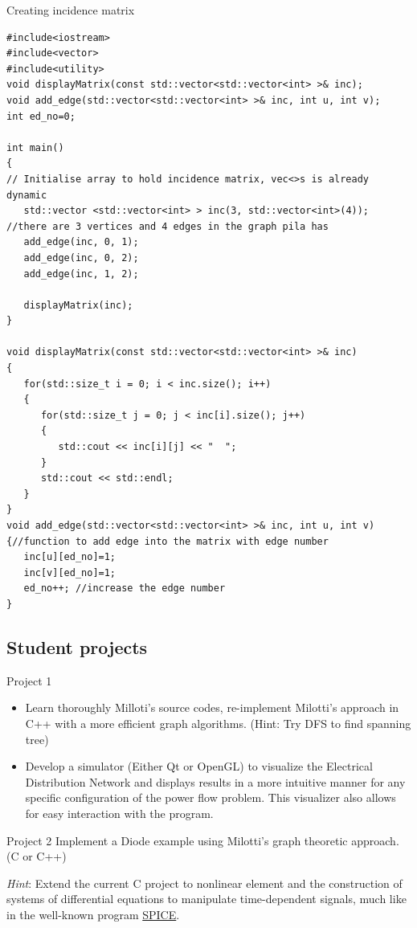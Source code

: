\documentclass[xcolor=dvipsnames]{beamer}
\begin{document}
\begin{frame}[fragile,shrink=5]{Creating incidence matrix}
\begin{verbatim}
#include<iostream>
#include<vector>
#include<utility>
void displayMatrix(const std::vector<std::vector<int> >& inc);
void add_edge(std::vector<std::vector<int> >& inc, int u, int v);
int ed_no=0;

int main() 
{
// Initialise array to hold incidence matrix, vec<>s is already dynamic
   std::vector <std::vector<int> > inc(3, std::vector<int>(4));
//there are 3 vertices and 4 edges in the graph pila has
   add_edge(inc, 0, 1);
   add_edge(inc, 0, 2);
   add_edge(inc, 1, 2);
   
   displayMatrix(inc);
}

void displayMatrix(const std::vector<std::vector<int> >& inc) 
{
   for(std::size_t i = 0; i < inc.size(); i++)
   { 
      for(std::size_t j = 0; j < inc[i].size(); j++) 
      {
         std::cout << inc[i][j] << "  ";
      }
      std::cout << std::endl;
   }
}
void add_edge(std::vector<std::vector<int> >& inc, int u, int v) 
{//function to add edge into the matrix with edge number
   inc[u][ed_no]=1;
   inc[v][ed_no]=1;
   ed_no++; //increase the edge number
}
\end{verbatim}	
\end{frame}

\subsection{Student projects}

\begin{frame}{Project 1}
\begin{itemize}
	\item Learn thoroughly Milloti's source codes, re-implement Milotti's approach in C++ with a more efficient graph algorithms. (Hint: Try DFS to find spanning tree)
	\item Develop a simulator (Either Qt or OpenGL) to visualize the Electrical Distribution Network and displays results in a more intuitive manner for any specific configuration of the power flow problem. This visualizer also allows for easy interaction with the program.
\end{itemize}

\end{frame}

\begin{frame}{Project 2}
	Implement a Diode example using Milotti's graph theoretic approach. (C or C++)

\emph{Hint}: Extend the current C project to nonlinear  element and the construction of systems of differential equations to manipulate time-dependent signals, much like in the well-known program \href{https://en.wikipedia.org/wiki/SPICE}{SPICE}. 
\end{frame}
\end{document}
